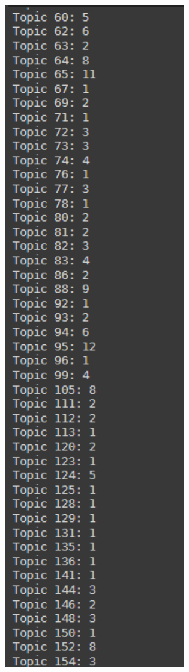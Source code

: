 \documentclass[a4paper]{article}
\begin{document}
\includegraphics[width=0.8\textwidth]{../images/LSI - 2.png}
\end{document}
